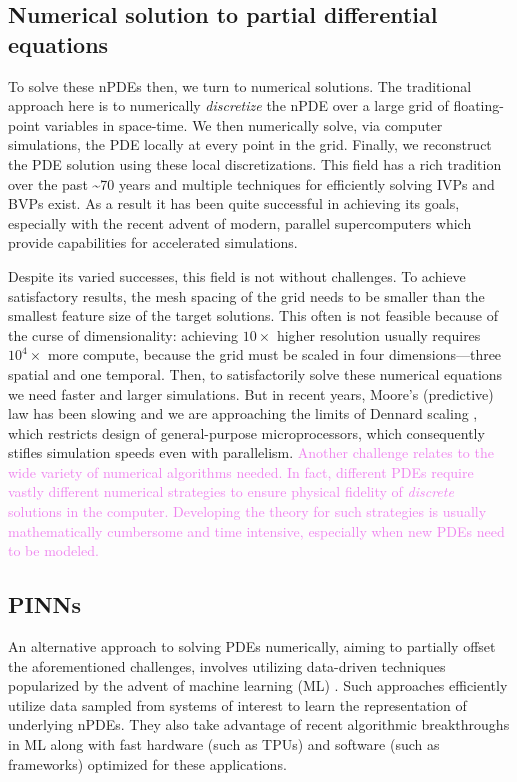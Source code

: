 \documentclass[11pt]{article}
\newcommand{\newcontent}[1]{\textcolor{violet}{#1}}
\begin{document}
\subsection{Numerical solution to partial differential equations}
\label{sec:org2de1e66}

To solve these nPDEs then, we turn to numerical solutions. The traditional
approach here is to numerically \emph{discretize} the nPDE over a large grid of
floating-point variables in space-time. We then numerically solve, via
computer simulations, the PDE locally at every point in the grid.
Finally, we reconstruct the PDE solution using these local discretizations.
This field has a rich tradition over the past \textasciitilde{}70 years \cite{quarteroni2008numerical} and multiple
techniques for efficiently solving IVPs and BVPs exist. As a result it has
been quite successful in achieving its goals, especially with the recent advent of
modern, parallel supercomputers which provide capabilities for accelerated simulations.

Despite its varied successes, this field is not without challenges. To
achieve satisfactory results, the mesh spacing of the grid needs to be
smaller than the smallest feature size of the target solutions. This often is
not feasible because of the curse of dimensionality: achieving \(10 \times\) higher
resolution usually requires \(10^4 \times\) more compute, because the
grid must be scaled in four dimensions---three spatial and one temporal.
Then, to satisfactorily solve these numerical equations we need faster and larger simulations. But in
recent years, Moore's (predictive) law has been slowing \cite{waldrop2016more} and we are
approaching the limits of Dennard scaling \cite{esmaeilzadeh2011dark}, which
restricts design of general-purpose microprocessors, which consequently
stifles simulation speeds even with parallelism.
\newcontent{
Another challenge relates to the wide variety of numerical algorithms needed.
In fact, different PDEs require vastly different numerical strategies to
ensure physical fidelity of \emph{discrete} solutions in the computer. Developing
the theory for such strategies is usually mathematically cumbersome and
time intensive, especially when new PDEs need to be modeled.
}

\subsection{PINNs}
\label{sec:orgaeac313}
An alternative approach to solving PDEs numerically, aiming to partially
offset the aforementioned challenges, involves utilizing data-driven
techniques popularized by the advent of machine learning
(ML) \cite{bar2019learning}. Such approaches efficiently utilize data sampled
from systems of interest to learn the representation of underlying nPDEs. They
also take advantage of recent algorithmic breakthroughs in ML along with fast hardware
(such as TPUs) and software (such as frameworks) optimized for these applications.
\end{document}

